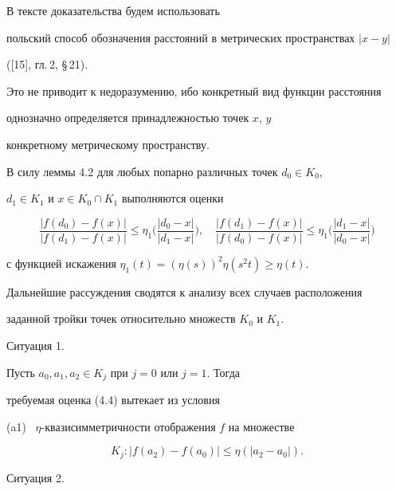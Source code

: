 \begin{pf}    %


В тексте доказательства будем использовать 


польский способ обозначения расстояний в метрических пространствах $|x-y|$ 


([15], гл.\,2, \S\,21). 


Это не приводит к недоразумению, ибо конкретный вид функции расстояния 


однозначно определяется принадлежностью точек $x$, $y$ 


конкретному метрическому пространству.


В силу леммы 4.2 для любых попарно различных точек $d_0 \in K_0$, 


$d_1 \in K_1$ и $x\in K_0\cap K_1$ выполняются оценки


\begin{equation}


\frac{|f(d_0)-f(x)|}{|f(d_1)-f(x)|} \leq \eta_1\bigg( 


\frac{|d_0-x|}{|d_1-x|} \bigg),\quad


\frac{|f(d_1)-f(x)|}{|f(d_0)-f(x)|} \leq \eta_1\bigg( 


\frac{|d_1-x|}{|d_0-x|} \bigg) 


\end{equation} 


с функцией искажения $\eta_1(t)=(\eta(s))^2 \eta(s^2t) \geq \eta(t)$.





Дальнейшие рассуждения сводятся к анализу всех случаев расположения 


заданной тройки точек относительно множеств $K_0$ и $K_1$.








Ситуация 1.


Пусть $a_0, a_1, a_2 \in K_j$ при $j=0$ или $j=1$. Тогда 


требуемая оценка (4.4) вытекает из условия


(a1) \  $\eta$-{}квазисимметричности отображения $f$ на множестве


$$


K_j: |f(a_2)-f(a_0)| \leq \eta(|a_2-a_0|).


$$





Ситуация 2.



\end{pf}
